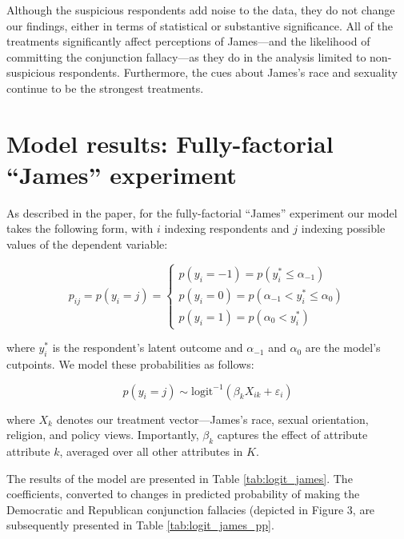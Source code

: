 \documentclass[12pt, letterpaper]{article}
\begin{document}
Although the suspicious respondents add noise to the data, they do not change our findings, either in terms of statistical or substantive significance. All of the treatments significantly affect perceptions of James---and the likelihood of committing the conjunction fallacy---as they do in the analysis limited to non-suspicious respondents. Furthermore, the cues about James's race and sexuality continue to be the strongest treatments.

\clearpage

\section{Model results: Fully-factorial ``James'' experiment} \label{si:james_ff_model}

As described in the paper, for the fully-factorial ``James'' experiment our model takes the following form, with $i$ indexing respondents and $j$ indexing possible values of the dependent variable:

\begin{equation}
p_{ij} = p(y_{i} = j) =
    \begin{cases}
p(y_{i} = -1) = p(y_{i}^{*} \leq \alpha_{-1}) \\
p(y_{i} = 0) = p(\alpha_{-1} < y_{i}^{*} \leq \alpha_{0}) \\
p(y_{i} = 1) = p(\alpha_{0} < y_{i}^{*})
    \end{cases}
\end{equation}

\noindent where $y^{*}_{i}$ is the respondent's latent outcome and $\alpha_{-1}$ and $\alpha_{0}$ are the model's cutpoints. We model these probabilities as follows:

\begin{equation}
p(y_{i} = j) \sim \text{logit}^{-1}(\beta_{k}X_{ik} + \varepsilon_{i})
\end{equation}

\noindent where $X_{k}$ denotes our treatment vector---James's race, sexual orientation, religion, and policy views. Importantly, $\beta_{k}$ captures the effect of attribute attribute $k$, averaged over all other attributes in $K$. 

The results of the model are presented in Table \ref{tab:logit_james}. The coefficients, converted to changes in predicted probability of making the Democratic and Republican conjunction fallacies (depicted in Figure 3, are subsequently presented in Table \ref{tab:logit_james_pp}.
\end{document}
